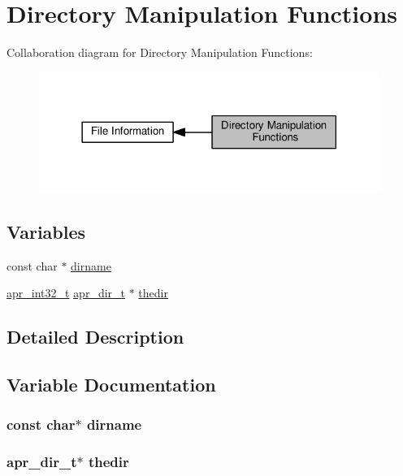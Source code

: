 \hypertarget{group__apr__dir}{}\section{Directory Manipulation Functions}
\label{group__apr__dir}
Collaboration diagram for Directory Manipulation Functions\+:
\nopagebreak
\begin{figure}[H]
\begin{center}
\leavevmode
\includegraphics[width=314pt]{group__apr__dir}
\end{center}
\end{figure}
\subsection*{Variables}
\begin{DoxyCompactItemize}
\item 
const char $\ast$ \hyperlink{group__apr__dir_gab8a2fd169b20f0b9d33959f7b17d35aa}{dirname}
\item 
\hyperlink{group__apr__platform_ga21ef1e35fd3ff9be386f3cb20164ff02}{apr\+\_\+int32\+\_\+t} \hyperlink{structapr__dir__t}{apr\+\_\+dir\+\_\+t} $\ast$ \hyperlink{group__apr__dir_gad52296d31a5d2f8307f60eed6a103209}{thedir}
\end{DoxyCompactItemize}


\subsection{Detailed Description}


\subsection{Variable Documentation}
\subsubsection[{\texorpdfstring{dirname}{dirname}}]{\setlength{\rightskip}{0pt plus 5cm}const char$\ast$ dirname}\hypertarget{group__apr__dir_gab8a2fd169b20f0b9d33959f7b17d35aa}{}\label{group__apr__dir_gab8a2fd169b20f0b9d33959f7b17d35aa}
\subsubsection[{\texorpdfstring{thedir}{thedir}}]{ {\bf apr\+\_\+dir\+\_\+t}$\ast$ thedir}\hypertarget{group__apr__dir_gad52296d31a5d2f8307f60eed6a103209}{}\label{group__apr__dir_gad52296d31a5d2f8307f60eed6a103209}
